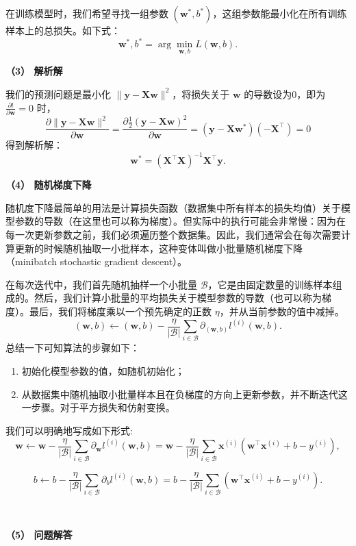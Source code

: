 \documentclass[UTF8]{ctexart}
\begin{document}
	在训练模型时，我们希望寻找一组参数 $(\bm{w}^*, b^*)$，这组参数能最小化在所有训练样本上的总损失。如下式：
	$$
	\bm{w}^*, b^* = \arg \min_{\bm{w}, b} L(\bm{w}, b).
	$$
	
	\textbf{（3） 解析解}
	
	我们的预测问题是最小化 $\|\bm{y} - \bm{X}\bm{w}\|^2$，将损失关于 $\bm{w}$ 的导数设为0，即为 $\displaystyle \frac{\partial l}{\partial \bm{w}} = 0$ 时，
	$$
	\displaystyle
	\frac{\partial \| \bm{y} - \bm{X} \bm{w} \|^2}{\partial \bm{w}}
	= \frac{\partial \frac{1}{2} (\bm{y} - \bm{X} \bm{w})^2}{\partial \bm{w}}
	= (\bm{y} - \bm{X} \bm{w}^*) (-\bm{X}^\top) = 0
	$$
	得到解析解：
	$$
	\displaystyle
	\bm{w}^* = (\bm{X}^\top \bm{X})^{-1} \bm{X}^\top \bm{y}.
	$$
	
	\textbf{（4） 随机梯度下降}
	
	随机度下降最简单的用法是计算损失函数（数据集中所有样本的损失均值）关于模型参数的导数（在这里也可以称为梯度）。但实际中的执行可能会非常慢：因为在每一次更新参数之前，我们必须遍历整个数据集。因此，我们通常会在每次需要计算更新的时候随机抽取一小批样本，这种变体叫做小批量随机梯度下降（minibatch stochastic gradient descent）。
	
	在每次迭代中，我们首先随机抽样一个小批量 $\mathcal{B}$，它是由固定数量的训练样本组成的。然后，我们计算小批量的平均损失关于模型参数的导数（也可以称为梯度）。最后，我们将梯度乘以一个预先确定的正数 $\eta$，并从当前参数的值中减掉。
	$$
	(\bm{w}, b) \leftarrow (\bm{w}, b) - \frac{\eta}{|\mathcal{B}|} \sum_{i \in \mathcal{B}} \partial_{(\bm{w}, b)} l^{(i)}(\bm{w}, b).
	$$
	总结一下可知算法的步骤如下：
	\begin{enumerate}
		\item 初始化模型参数的值，如随机初始化；
		\item 从数据集中随机抽取小批量样本且在负梯度的方向上更新参数，并不断迭代这一步骤。对于平方损失和仿射变换。
	\end{enumerate}
	我们可以明确地写成如下形式:
	$$
	\bm{w} \leftarrow \bm{w} - \frac{\eta}{|\mathcal{B}|} \sum_{i \in \mathcal{B}} \partial_{\bm{w}} l^{(i)}(\bm{w}, b) = \bm{w} - \frac{\eta}{|\mathcal{B}|} \sum_{i \in \mathcal{B}} \bm{x}^{(i)} \left( \bm{w}^\top \bm{x}^{(i)} + b - y^{(i)} \right),
	$$
	
	$$
	b \leftarrow b - \frac{\eta}{|\mathcal{B}|} \sum_{i \in \mathcal{B}} \partial_b l^{(i)}(\bm{w}, b) = b - \frac{\eta}{|\mathcal{B}|} \sum_{i \in \mathcal{B}} \left( \bm{w}^\top \bm{x}^{(i)} + b - y^{(i)} \right).
	$$
	
	
	\, 
	
	
	\textbf{（5） 问题解答}
	
\end{document}
